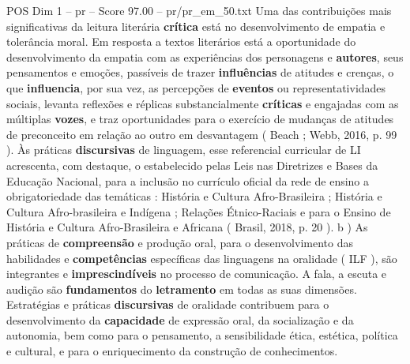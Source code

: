 \begin{textsample}{POS Dim 1 – pr – Score 97.00 – pr/pr\_em\_50.txt}
Uma das contribuições mais significativas da leitura literária \textbf{crítica} está no desenvolvimento de empatia e tolerância moral.
Em resposta a textos literários está a oportunidade do desenvolvimento da empatia com as experiências dos personagens e \textbf{autores}, seus pensamentos e emoções, passíveis de trazer \textbf{influências} de atitudes e crenças, o que \textbf{influencia}, por sua vez, as percepções de \textbf{eventos} ou representatividades sociais, levanta reflexões e réplicas substancialmente \textbf{críticas} e engajadas com as múltiplas \textbf{vozes}, e traz oportunidades para o exercício de mudanças de atitudes de preconceito em relação ao outro em desvantagem ( Beach ; Webb, 2016, p. 99 ).
Às práticas \textbf{discursivas} de linguagem, esse referencial curricular de LI acrescenta, com destaque, o estabelecido pelas Leis nas Diretrizes e Bases da Educação Nacional, para a inclusão no currículo oficial da rede de ensino a obrigatoriedade das temáticas : História e Cultura Afro-Brasileira ; História e Cultura Afro-brasileira e Indígena ; Relações Étnico-Raciais e para o Ensino de História e Cultura Afro-Brasileira e Africana ( Brasil, 2018, p. 20 ). b ) As práticas de \textbf{compreensão} e produção oral, para o desenvolvimento das habilidades e \textbf{competências} específicas das linguagens na oralidade ( ILF ), são integrantes e \textbf{imprescindíveis} no processo de comunicação.
A fala, a escuta e audição são \textbf{fundamentos} do \textbf{letramento} em todas as suas dimensões.
Estratégias e práticas \textbf{discursivas} de oralidade contribuem para o desenvolvimento da \textbf{capacidade} de expressão oral, da socialização e da autonomia, bem como para o pensamento, a sensibilidade ética, estética, política e cultural, e para o enriquecimento da construção de conhecimentos.

\end{textsample}
